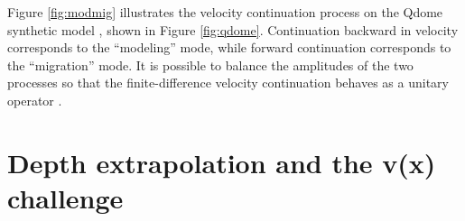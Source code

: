 \par
Figure \ref{fig:modmig} illustrates the velocity continuation process
on the Qdome synthetic model \cite{Claerbout.gem.97}, shown in Figure
\ref{fig:qdome}. Continuation backward in velocity corresponds to the
``modeling'' mode, while forward continuation corresponds to the
``migration'' mode. It is possible to balance the amplitudes of the
two processes so that the finite-difference velocity continuation
behaves as a unitary operator
\cite{Fomel.sep.92.159,Fomel.sep.92.267}.


\section{Depth extrapolation and the v(x) challenge}

